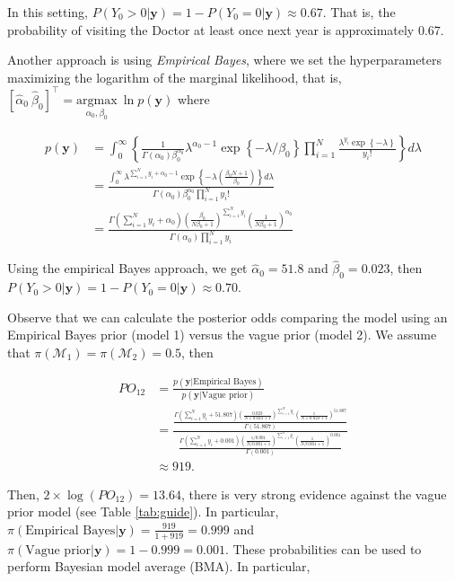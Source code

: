 In this setting, $P(Y_0>0|\mathbf{y})=1-P(Y_0=0|\mathbf{y})\approx 0.67$. That is, the probability of visiting the Doctor at least once next year is approximately 0.67.

Another approach is using \textit{Empirical Bayes}, where we set the hyperparameters maximizing the logarithm of the marginal likelihood, that is, $\left[\hat{\alpha}_0 \ \hat{\beta}_0\right]^{\top}=\underset{\alpha_0 ,\beta_0}{\mathrm{argmax}} \ \ln p(\mathbf{y})$ where

\begin{align*}
	p(\mathbf{y})&=\int_0^{\infty}\left\{\frac{1}{\Gamma(\alpha_0)\beta_0^{\alpha_0}}\lambda^{\alpha_0-1}\exp\left\{-\lambda/\beta_0\right\} \prod_{i=1}^N\frac{\lambda^{y_i}\exp\left\{-\lambda\right\}}{ y_i!}\right\}d\lambda\\
	&=\frac{\int_0^{\infty}\lambda^{\sum_{i=1}^N y_i+\alpha_0-1}\exp\left\{-\lambda \left(\frac{\beta_0 N +1}{\beta_0}\right) \right\}d\lambda}{\Gamma(\alpha_0)\beta_0^{\alpha_0}\prod_{i=1}^N y_i!}\\
	&=\frac{\Gamma(\sum_{i=1}^N y_i+\alpha_0)\left(\frac{\beta_0}{N\beta_0+1}\right)^{\sum_{i=1}^N y_i}\left(\frac{1}{N\beta_0+1}\right)^{\alpha_0}}{\Gamma(\alpha_0)\prod_{i=1}^N y_i}
\end{align*}

Using the empirical Bayes approach, we get $\hat{\alpha}_0=51.8$ and $\hat{\beta}_0=0.023$, then $P(Y_0>0|\mathbf{y})=1-P(Y_0=0|\mathbf{y})\approx 0.70$.

Observe that we can calculate the posterior odds comparing the model using an Empirical Bayes prior (model 1) versus the vague prior (model 2). We assume that $\pi(\mathcal{M}_1)=\pi(\mathcal{M}_2)=0.5$, then

\begin{align*}
	PO_{12}&=\frac{p(\mathbf{y}|\text{Empirical Bayes})}{p(\mathbf{y}|\text{Vague prior})}\\
	&=\frac{\frac{\Gamma(\sum_{i=1}^N y_i+51.807)\left(\frac{0.023}{N\times 0.023+1}\right)^{\sum_{i=1}^N y_i}\left(\frac{1}{N\times 0.023+1}\right)^{51.807}}{\Gamma(51.807)}}{\frac{\Gamma(\sum_{i=1}^N y_i+0.001)\left(\frac{1/0.001}{N/0.001+1}\right)^{\sum_{i=1}^N y_i}\left(\frac{1}{N/0.001+1}\right)^{0.001}}{\Gamma(0.001)}}\\
	&\approx 919.
\end{align*}

Then, $2\times \log(PO_{12})=13.64$, there is very strong evidence against the vague prior model (see Table \ref{tab:guide}). In particular, $\pi(\text{Empirical Bayes}|\mathbf{y})=\frac{919}{1+919}=0.999$ and $\pi(\text{Vague prior}|\mathbf{y})=1-0.999=0.001$. These probabilities can be used to perform Bayesian model average (BMA). In particular,

